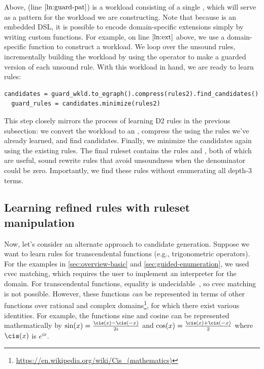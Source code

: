 Above,  (line $\ref{ln:guard-pat}$) is a workload consisting of
  a single \sexp, which will serve as a pattern for the workload we are
  constructing.
Note that because \enumo is an embedded DSL, it is possible to encode
  domain-specific extensions simply by writing custom functions.
For example, on line $\ref{ln:ext}$ above, we use a domain-specific function
  to construct a workload.
We loop over the unsound rules, incrementally building the workload
  by using the  operator to make a guarded version of each unsound rule.
With this workload in hand, we are ready to learn rules:

\begin{lstlisting}[name=guided]
  candidates = guard_wkld.to_egraph().compress(rules2).find_candidates()
  guard_rules = candidates.minimize(rules2)
\end{lstlisting}

This step closely mirrors the process of learning D2 rules in the
  previous subsection: we convert the workload to an \egraph, compress
  the \egraph using the rules we've already learned, and find candidates.
Finally, we minimize the candidates again using the existing rules.
The final ruleset contains the rules
  \C{(/ a a) \rewritesto \xspace (if a 1 (/ a a))} and
  \C{(/ 0 a) \rewritesto \xspace (if a 0 (/ 0 a))}, both of which are useful, sound
  rewrite rules that avoid unsoundness when the denominator could be zero.
Importantly, we find these rules without enumerating all depth-3
  terms.

\subsection{Learning refined rules with ruleset manipulation}
\label{subsec:ffoverview}

Now, let's consider an alternate approach to candidate generation.
Suppose we want to learn rules for
  transcendental functions (e.g., trigonometric operators).
For the examples in \autoref{sec:overview-basic}
and \autoref{sec:guided-enumeration}, we used cvec matching,
  which requires the user to
  implement an interpreter for the domain.
For transcendental functions,
  equality is undecidable~\citep{boehm}, so
  cvec matching is not possible.
However, these functions \textit{can} be represented
  in terms of other functions
  over rational and complex
  domains\footnote{\url{https://en.wikipedia.org/wiki/Cis_(mathematics)}},
  for which there exist various identities.
For example,
  the functions sine and cosine can
  be represented mathematically by
  $\sin(x) = \frac{\cis(x) - \cis(-x)}{2i}$ and
  $\cos(x) = \frac{\cis(x) + \cis(-x)}{2}$
  where $\cis(x)$ is $e^{ix}$.

